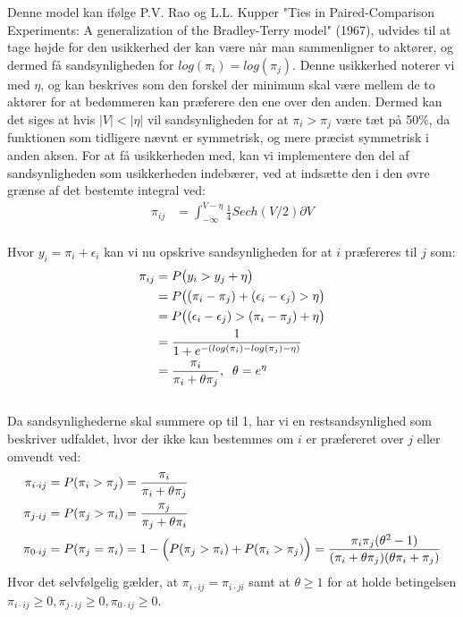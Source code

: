\documentclass[11pt,a4paper]{article}
\begin{document}
Denne model kan ifølge P.V. Rao og L.L. Kupper "Ties in Paired-Comparison Experiments: A generalization of the Bradley-Terry model" (1967), udvides til at tage højde for den usikkerhed der kan være når man sammenligner to aktører, og dermed få sandsynligheden for $log(\pi_i)=log(\pi_j)$. Denne usikkerhed noterer vi med $\eta$, og kan beskrives som den forskel der minimum skal være mellem de to aktører for at bedømmeren kan præferere den ene over den anden. Dermed kan det siges at hvis $|V| < |\eta|$ vil sandsynligheden for at $\pi_i > \pi_j$ være tæt på 50\%, da funktionen som tidligere nævnt er symmetrisk, og mere præcist symmetrisk i anden aksen. For at få usikkerheden med, kan vi implementere den del af sandsynligheden som usikkerheden indebærer, ved at indsætte den i den øvre grænse af det bestemte integral ved:\\  
\begin{align*}
\pi_{ij} &= \int_{-\infty}^{V-\eta} \frac{1}{4}Sech(V/2) \partial V
\end{align*}
\\
Hvor $y_i=\pi_i+\epsilon_i$ kan vi nu opskrive sandsynligheden for at $i$ præfereres til $j$ som:
\begin{align*}
\pi_{ij}&=P\big{(}y_i>y_j+\eta\big{)}
\\&=P\big{(}(\pi_i-\pi_j)+(\epsilon_i-\epsilon_j)>\eta\big{)}
\\&=P\big{(}(\epsilon_i-\epsilon_j)>(\pi_i-\pi_j)+\eta\big{)}
\\&=\frac{1}{1+e^{-(log(\pi_i)-log(\pi_j)-\eta)}} 
\\&=\frac{\pi_i}{\pi_i+\theta \pi_j},\;\;\theta = e^\eta
\end{align*}
\\
Da sandsynlighederne skal summere op til 1, har vi en restsandsynlighed som beskriver udfaldet, hvor der ikke kan bestemmes om $i$ er præfereret over $j$ eller omvendt ved:
\begin{align*}
\pi_{i\cdot ij} &= P(\pi_i > \pi_j) = \frac{\pi_i}{\pi_i+\theta \pi_j}\\
\pi_{j\cdot ij} &= P(\pi_j > \pi_i) = \frac{\pi_j}{\pi_j+\theta \pi_i}\\
\pi_{0\cdot ij} &= P(\pi_j = \pi_i) = 1 - \Big{(}P(\pi_j > \pi_i) + P(\pi_i > \pi_j)\Big{)}= \frac{\pi_i \pi_j(\theta^2 -1)}{(\pi_i+\theta \pi_j)(\theta \pi_i + \pi_j)} 
\end{align*}
Hvor det selvfølgelig gælder, at $\pi_{i\cdot ij}=\pi_{i\cdot ji}$ samt at $\theta\geq1$ for at holde betingelsen \; $\pi_{i\cdot ij}\geq0,\pi_{j\cdot ij}\geq0,\pi_{0\cdot ij}\geq0$. 
\end{document}
